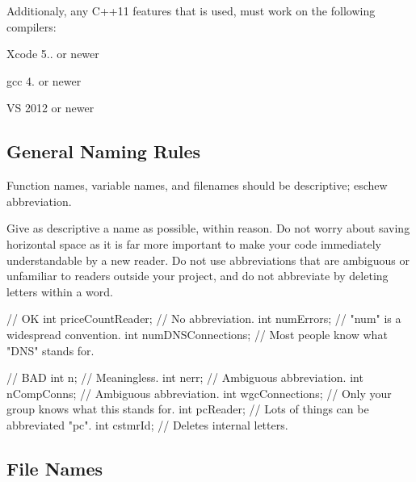 Additionaly, any C++11 features that is used, must work on the following compilers\+:


\begin{DoxyItemize}
\item Xcode 5.. or newer
\item gcc 4. or newer
\item VS 2012 or newer
\end{DoxyItemize}

\subsection*{General Naming Rules}

Function names, variable names, and filenames should be descriptive; eschew abbreviation.

Give as descriptive a name as possible, within reason. Do not worry about saving horizontal space as it is far more important to make your code immediately understandable by a new reader. Do not use abbreviations that are ambiguous or unfamiliar to readers outside your project, and do not abbreviate by deleting letters within a word.


\begin{DoxyCode}
\textcolor{comment}{// OK}
\textcolor{keywordtype}{int} priceCountReader;     \textcolor{comment}{// No abbreviation.}
\textcolor{keywordtype}{int} numErrors;            \textcolor{comment}{// "num" is a widespread convention.}
\textcolor{keywordtype}{int} numDNSConnections;    \textcolor{comment}{// Most people know what "DNS" stands for.}
\end{DoxyCode}



\begin{DoxyCode}
\textcolor{comment}{// BAD}
\textcolor{keywordtype}{int} n;                     \textcolor{comment}{// Meaningless.}
\textcolor{keywordtype}{int} nerr;                  \textcolor{comment}{// Ambiguous abbreviation.}
\textcolor{keywordtype}{int} nCompConns;            \textcolor{comment}{// Ambiguous abbreviation.}
\textcolor{keywordtype}{int} wgcConnections;        \textcolor{comment}{// Only your group knows what this stands for.}
\textcolor{keywordtype}{int} pcReader;              \textcolor{comment}{// Lots of things can be abbreviated "pc".}
\textcolor{keywordtype}{int} cstmrId;               \textcolor{comment}{// Deletes internal letters.}
\end{DoxyCode}


\subsection*{File Names}

